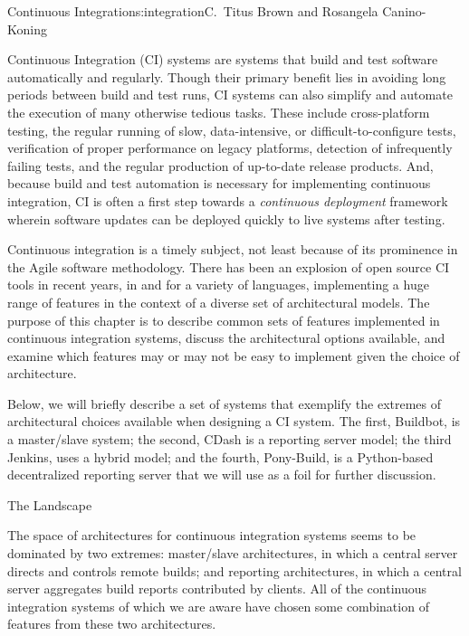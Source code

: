 \begin{aosachapter}{Continuous Integration}{s:integration}{C.\ Titus Brown and Rosangela Canino-Koning}

Continuous Integration (CI) systems are systems that build and test
software automatically and regularly.  Though their primary benefit
lies in avoiding long periods between build and test runs, CI systems
can also simplify and automate the execution of many otherwise tedious
tasks. These include cross-platform testing, the regular running of slow,
data-intensive, or difficult-to-configure tests, verification of
proper performance on legacy platforms, detection of infrequently
failing tests, and the regular production of up-to-date release
products. And, because build and test automation is necessary for
implementing continuous integration, CI is often a first step towards
a \emph{continuous deployment} framework wherein software updates can be
deployed quickly to live systems after testing.

Continuous integration is a timely subject, not least because of its
prominence in the Agile software methodology.  There has been an
explosion of open source CI tools in recent years, in and for a
variety of languages, implementing a huge range of features in the
context of a diverse set of architectural models.  The purpose of this
chapter is to describe common sets of features implemented in
continuous integration systems, discuss the architectural options
available, and examine which features may or may not be easy to
implement given the choice of architecture.
 
Below, we will briefly describe a set of systems that exemplify the
extremes of architectural choices available when designing a CI
system. The first, Buildbot, is a master/slave system; the second,
CDash is a reporting server model; the third Jenkins, uses a hybrid model; and the fourth, Pony-Build, 
is a Python-based decentralized reporting server that we will use
as a foil for further discussion.

\begin{aosasect1}{The Landscape}

The space of architectures for continuous integration systems seems to
be dominated by two extremes: master/slave architectures, in which a
central server directs and controls remote builds; and reporting
architectures, in which a central server aggregates build reports
contributed by clients. All of the continuous integration systems of
which we are aware have chosen some combination of features from these
two architectures.


\end{aosasect1}
\end{aosachapter}
